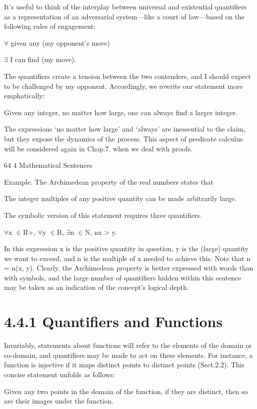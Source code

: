 \documentclass[11pt]{article}
\theoremstyle{plain}
\theoremstyle{definition}
\begin{document}
It's useful to think of the interplay between universal and existential quantifiers as a representation of an adversarial system---like a court of law---based on the following rules of engagement:

$\forall$ given any (my opponent's move)

$\exists$ I can find (my move).

The quantifiers create a tension between the two contenders, and I should expect to be challenged by my opponent. Accordingly, we rewrite our statement more emphatically:

Given any integer, no matter how large, one can always find a larger integer.

The expressions `no matter how large' and `always' are inessential to the claim, but they expose the dynamics of the process. This aspect of predicate calculus will be considered again in Chap.7, when we deal with proofs.

64 4 Mathematical Sentences

Example. The Archimedean property of the real numbers states that

The integer multiples of any positive quantity can be made arbitrarily large.

The symbolic version of this statement requires three quantifiers.

$\forall$x $\in$R+, $\forall$y $\in$R, $\exists$n $\in$N, nx > y.

In this expression x is the positive quantity in question, y is the (large) quantity we want to exceed, and n is the multiple of x needed to achieve this. Note that n = n(x, y). Clearly, the Archimedean property is better expressed with words than with symbols, and the large number of quantifiers hidden within this sentence may be taken as an indication of the concept's logical depth.

\section{4.4.1 Quantifiers and Functions}

Invariably, statements about functions will refer to the elements of the domain or co-domain, and quantifiers may be made to act on these elements. For instance, a function is injective if it maps distinct points to distinct points (Sect.2.2). This concise statement unfolds as follows:

Given any two points in the domain of the function, if they are distinct, then so are their images under the function.
\end{document}
